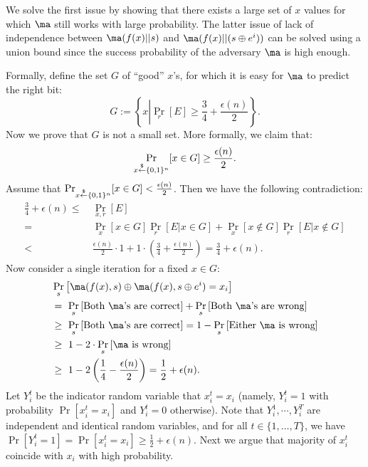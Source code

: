 We solve the first issue by showing that there exists a large set of $x$ values for which $\ma$ still works with large probability.
The latter issue of lack of independence between $\ma(f(x)|| s)$ and $\ma(f(x) || (s \oplus e^i))$ can be solved using a union bound since the success probability of the adversary $\ma$ is high enough.

Formally, define the set $G$ of ``good'' $x$'s, for which it is easy for $\ma$ to predict the right bit:
$$G := \left\{x \left| \Pr_r \left[ E \right]\geq \frac{3}{4} + \frac{\epsilon(n)}{2} \right. \right\}.$$
Now we prove that $G$ is not a small set. More formally, we claim that:
$$\Pr_{x \stackrel{\$}{\leftarrow} \{0,1\}^{n}}[x \in G] \geq \frac{\epsilon(n)}{2}.$$
Assume that $\Pr_{x \stackrel{\$}{\leftarrow} \{0,1\}^{n}}[x \in G] < \frac{\epsilon(n)}{2}$. Then we have the following contradiction:
\begin{align*}
\frac{3}{4} + \epsilon(n) \leq&~ \Pr_{x,r}[E]\\
=&~ \Pr_x [x \in G] \Pr_{r}[E| x\in G] + \Pr_x [x \notin G] \Pr_{r}[E | x\notin G]\\
< &~ \frac{\epsilon(n)}{2} \cdot 1 + 1\cdot \left(\frac{3}{4}+\frac{\epsilon(n)}{2}\right)  = \frac{3}{4} + \epsilon(n).
\end{align*}
Now consider a single iteration for a fixed $x \in G$:
\begin{align*}
&\Pr_{s} \left[ \ma(f(x), s) \oplus \ma(f(x), s\oplus e^i) = x_i \right]\\
&=~ \Pr_{s} \left[ \text{Both $\ma$'s are correct} \right] + \Pr_{s} \left[ \text{Both $\ma$'s are wrong} \right]\\
&\geq~ \Pr_{s} \left[ \text{Both $\ma$'s are correct} \right] = 1- \Pr_{s} \left[ \text{Either $\ma$ is wrong} \right]\\
&\geq~ 1- 2\cdot\Pr_{s} \left[ \text{$\ma$ is wrong} \right]\\
&\geq~ 1-2\left(\frac{1}{4} - \frac{\epsilon(n)}{2} \right) 
= \frac{1}{2} + \epsilon(n).
\end{align*}
Let $Y_i^t$ be the indicator random variable that $x_i^t = x_i$ (namely, $Y_i^t=1$ with probability $\Pr[x_i^t = x_i]$ and $Y_i^t=0$ otherwise).
Note that $Y_i^1, \cdots, Y_i^T$ are independent and identical random variables, and for all $t \in \{1,\ldots, T\}$, we have $\Pr[Y_i^t=1] = \Pr[x_i^t = x_i] \geq \frac{1}{2} + \epsilon(n)$.
Next we argue that majority of $x_i^t$ coincide with $x_i$ with high probability.
